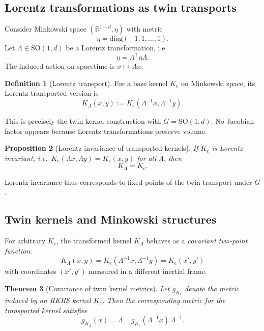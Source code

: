 \documentclass[11pt]{article}
\newtheorem{theorem}{Theorem}[section]
\newtheorem{proposition}[theorem]{Proposition}
\theoremstyle{definition}
\newtheorem{definition}[theorem]{Definition}
\begin{document}
	\subsection{Lorentz transformations as twin transports}
	
	Consider Minkowski space $(\mathbb{R}^{1+d},\eta)$ with metric
	\[
	\eta = \mathrm{diag}(-1,1,\ldots,1).
	\]
	Let $\Lambda\in \mathrm{SO}(1,d)$ be a Lorentz transformation, i.e.
	\[
	\eta = \Lambda^\top \eta \Lambda.
	\]
	The induced action on spacetime is $x\mapsto \Lambda x$.
	
	\begin{definition}[Lorentz transport]
		For a base kernel $K_e$ on Minkowski space, its Lorentz-transported version is
		\[
		K_\Lambda(x,y) := K_e(\Lambda^{-1}x,\Lambda^{-1}y).
		\]
	\end{definition}
	
	This is precisely the twin kernel construction with $G=\mathrm{SO}(1,d)$.
	No Jacobian factor appears because Lorentz transformations preserve volume.
	
	\begin{proposition}[Lorentz invariance of transported kernels]
		If $K_e$ is Lorentz invariant, i.e.\ $K_e(\Lambda x,\Lambda y)=K_e(x,y)$ for all $\Lambda$, then
		\[
		K_\Lambda = K_e.
		\]
	\end{proposition}
	
	Lorentz invariance thus corresponds to fixed points of the twin transport under $G$.
	
	\subsection{Twin kernels and Minkowski structures}
	
	For arbitrary $K_e$, the transformed kernel $K_\Lambda$ behaves as a \emph{covariant two-point function}:
	\[
	K_\Lambda(x,y) 
	= K_e(\Lambda^{-1}x,\Lambda^{-1}y)
	= K_e(x',y')
	\]
	with coordinates $(x',y')$ measured in a different inertial frame.
	
	\begin{theorem}[Covariance of twin kernel metrics]
		Let $g_{K_e}$ denote the metric induced by an RKHS kernel $K_e$.
		Then the corresponding metric for the transported kernel satisfies
		\[
		g_{K_\Lambda}(x)
		= \Lambda^{-\top} g_{K_e}(\Lambda^{-1}x)\,\Lambda^{-1}.
		\]
	\end{theorem}
	
\end{document}
